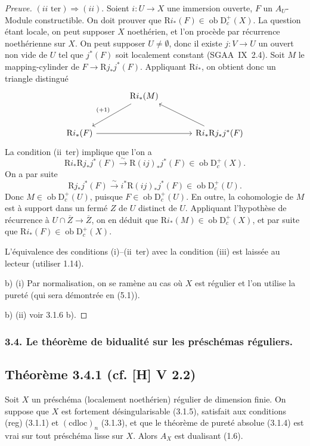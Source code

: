 \documentclass[11pt]{article}
\newcommand{\R}{\mathrm{R}}\newcommand{\RHomCore}{\mathrm{RHom}}
\newcommand{\D}{\mathrm{D}}
\newcommand{\ob}{\operatorname{ob}}
\newcommand{\ol}[1]{\overline{#1}}
\providecommand{\ob}{\operatorname{ob}}
\providecommand{\R}{\mathrm R}
\begin{document}
\begin{proof}[Preuve]
$(ii\text{~ter}) \Rightarrow (ii)$. Soient $i : U \to X$ une immersion ouverte, $F$ un $A_U$-Module constructible. On doit prouver que $\R i_{*}(F) \in \ob \D_c^{+}(X)$. La question étant locale, on peut supposer $X$ noethérien, et l'on procède par récurrence noethérienne sur $X$. On peut supposer $U \neq \emptyset$, donc il existe $j : V \to U$ un ouvert non vide de $U$ tel que $j^{*}(F)$ soit localement constant (SGAA~IX~2.4). Soit $M$ le mapping-cylinder de $F \to \R j_{*}j^{*}(F)$. Appliquant $\R i_{*}$, on obtient donc un triangle distingué
\[
\begin{tikzcd}[column sep=large,row sep=large]
& \R i_{*}(M) \arrow[dl,"{(+1)}"'] & \\
\R i_{*}(F) \arrow[rr] & & \R i_{*}\R j_{*}j^{*}(F) \arrow[ul]
\end{tikzcd}
\]
La condition (ii~ter) implique que l'on a
\[
\R i_{*} \R j_{*} j^{*}(F) \xrightarrow{\sim} \R(ij)_{*} j^{*}(F) \in \ob \D_c^{+}(X).
\]
On a par suite
\[
\R j_{*}j^{*}(F) \xrightarrow{\sim} i^{*} \R(ij)_{*} j^{*}(F) \in \ob \D_c^{+}(U).
\]
Donc $M \in \ob \D_c^{+}(U)$, puisque $F \in \ob \D_c^{+}(U)$. En outre, la cohomologie de $M$ est à support dans un fermé $Z$ de $U$ distinct de $U$. Appliquant l'hypothèse de récurrence à $U \cap \ol{Z} \to \ol{Z}$, on en déduit que $\R i_{*}(M) \in \ob \D_c^{+}(X)$, et par suite que $\R i_{*}(F) \in \ob \D_c^{+}(X)$.

L'équivalence des conditions (i)--(ii~ter) avec la condition (iii) est laissée au lecteur (utiliser 1.14).

b) (i) Par normalisation, on se ramène au cas où $X$ est régulier et l'on utilise la pureté (qui sera démontrée en (5.1)).

b) (ii) voir 3.1.6 b).
\end{proof}

\subsubsection{3.4. Le théorème de bidualité sur les préschémas réguliers.}

\subsection*{Théorème 3.4.1 (cf. [H] V 2.2)}
Soit $X$ un préschéma (localement noethérien) régulier de dimension finie. On suppose que $X$ est fortement désingularisable (3.1.5), satisfait aux conditions (reg) (3.1.1) et $(\mathrm{cdloc})_n$ (3.1.3), et que le théorème de pureté absolue (3.1.4) est vrai sur tout préschéma lisse sur $X$. Alors $A_X$ est dualisant (1.6).
\end{document}
